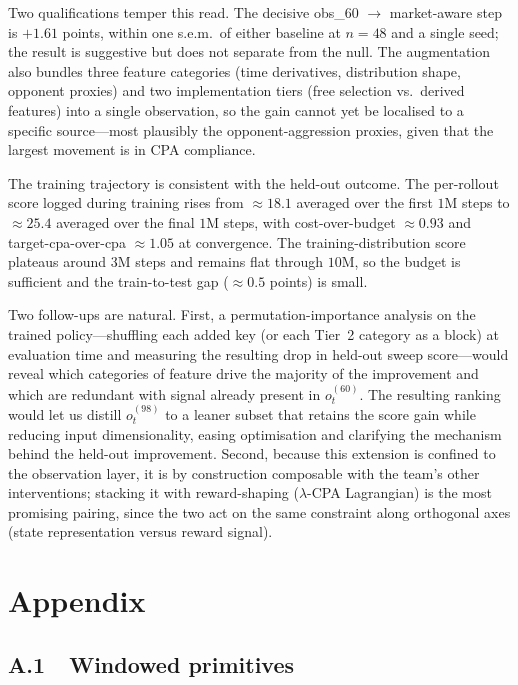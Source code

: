\documentclass[11pt]{article}
\begin{document}
Two qualifications temper this read. The decisive obs\_60 $\to$
market-aware step is $+1.61$ points, within one s.e.m.\ of either
baseline at $n{=}48$ and a single seed; the result is suggestive but
does not separate from the null. The augmentation also bundles three
feature categories (time derivatives, distribution shape, opponent
proxies) and two implementation tiers (free selection vs.\ derived
features) into a single observation, so the gain cannot yet be localised
to a specific source---most plausibly the opponent-aggression proxies,
given that the largest movement is in CPA compliance.

The training trajectory is consistent with the held-out outcome. The
per-rollout score logged during training rises from $\approx\!18.1$
averaged over the first $1$M steps to $\approx\!25.4$ averaged over the
final $1\mathrm{M}$ steps, with cost-over-budget $\approx\!0.93$ and
target-cpa-over-cpa $\approx\!1.05$ at convergence. The training-distribution
score plateaus around $3\mathrm{M}$ steps and remains flat through
$10\mathrm{M}$, so the budget is sufficient and the train-to-test gap
($\approx\!0.5$ points) is small.

Two follow-ups are natural. First, a permutation-importance analysis on
the trained policy---shuffling each added key (or each Tier~2 category as
a block) at evaluation time and measuring the resulting drop in held-out
sweep score---would reveal which categories of feature drive the majority
of the improvement and which are redundant with signal already present in
$o_t^{(60)}$. The resulting ranking would let us distill $o_t^{(98)}$ to a
leaner subset that retains the score gain while reducing input
dimensionality, easing optimisation and clarifying the mechanism behind
the held-out improvement. Second, because this extension is confined to
the observation layer, it is by construction composable with the team's
other interventions; stacking it with reward-shaping ($\lambda$-CPA
Lagrangian) is the most promising pairing, since the two act on the same
constraint along orthogonal axes (state representation versus reward
signal).

\section{Appendix}

\subsection*{A.1\ \ Windowed primitives}
\end{document}
